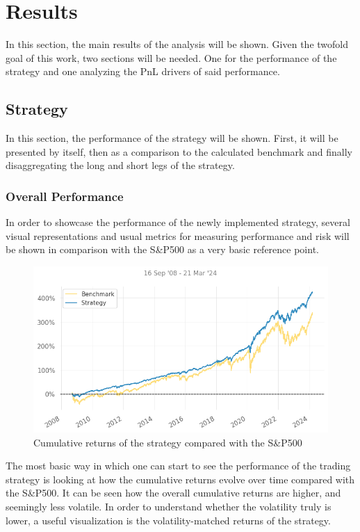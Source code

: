 \section{Results}
In this section, the main results of the analysis will be shown. Given the twofold goal of this work, two sections will be needed. One for the performance of the strategy and one analyzing the PnL drivers of said performance. 

\subsection{Strategy}
In this section, the performance of the strategy will be shown. First, it will be presented by itself, then as a comparison to the calculated benchmark and finally disaggregating the long and short legs of the strategy. 

\subsubsection{Overall Performance}
\label{sec:overall-performance}
In order to showcase the performance of the newly implemented strategy, several visual representations and usual metrics for measuring performance and risk will be shown in comparison with the S\&P500 as a very basic reference point. 

\begin{figure}[ht]
    \includegraphics[width=\linewidth]{assets/strat-vs-sp500.png}
    \caption{Cumulative returns of the strategy compared with the S\&P500}
    \label{fig:strat-vs-sp500}
\end{figure}

The most basic way in which one can start to see the performance of the trading strategy is looking at how the cumulative returns evolve over time compared with the S\&P500. It can be seen how the overall cumulative returns are higher, and seemingly less volatile. 
In order to understand whether the volatility truly is lower, a useful visualization is the volatility-matched returns of the strategy.

